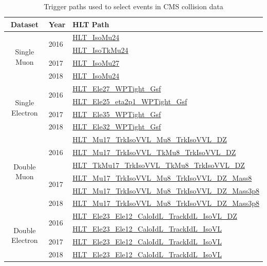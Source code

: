 \begin{table}[!ht]
  \centering
  \caption{Trigger paths used to select events in CMS collision data}
  \begin{tabular}{cll}%
    \toprule
    Dataset & Year                  & HLT Path                                          \\
    \midrule
    \multirow{4}{*}{Single Muon}
            & \multirow{2}{*}{2016} & \url{HLT_IsoMu24}                                 \\
            &                       & \url{HLT_IsoTkMu24}                               \\
    \cmidrule(lr){2-3}
            & \multirow{1}{*}{2017} & \url{HLT_IsoMu27}                                 \\
    \cmidrule(lr){2-3}
            & \multirow{1}{*}{2018} & \url{HLT_IsoMu24}                                 \\
    \midrule
    \multirow{4}{*}{Single Electron}
            & \multirow{2}{*}{2016} & \url{HLT_Ele27_WPTight_Gsf}                       \\
            &                       & \url{HLT_Ele25_eta2p1_WPTight_Gsf}                \\
    \cmidrule(lr){2-3}
            & \multirow{1}{*}{2017} & \url{HLT_Ele35_WPTight_Gsf}                       \\
    \cmidrule(lr){2-3}
            & \multirow{1}{*}{2018} & \url{HLT_Ele32_WPTight_Gsf}                       \\
    \midrule
    \multirow{6}{*}{Double Muon}
            & \multirow{3}{*}{2016} & \url{HLT_Mu17_TrkIsoVVL_Mu8_TrkIsoVVL_DZ}         \\
            &                       & \url{HLT_Mu17_TrkIsoVVL_TkMu8_TrkIsoVVL_DZ}       \\
            &                       & \url{HLT_TkMu17_TrkIsoVVL_TkMu8_TrkIsoVVL_DZ}     \\
    \cmidrule(lr){2-3}
            & \multirow{2}{*}{2017} & \url{HLT_Mu17_TrkIsoVVL_Mu8_TrkIsoVVL_DZ_Mass8}   \\
            &                       & \url{HLT_Mu17_TrkIsoVVL_Mu8_TrkIsoVVL_DZ_Mass3p8} \\
    \cmidrule(lr){2-3}
            & \multirow{1}{*}{2018} & \url{HLT_Mu17_TrkIsoVVL_Mu8_TrkIsoVVL_DZ_Mass3p8} \\
    \midrule
    \multirow{4}{*}{Double Electron}
            & \multirow{2}{*}{2016} & \url{HLT_Ele23_Ele12_CaloIdL_TrackIdL_IsoVL_DZ}   \\
            &                       & \url{HLT_Ele23_Ele12_CaloIdL_TrackIdL_IsoVL}      \\
    \cmidrule(lr){2-3}
            & \multirow{1}{*}{2017} & \url{HLT_Ele23_Ele12_CaloIdL_TrackIdL_IsoVL}      \\
    \cmidrule(lr){2-3}
            & \multirow{1}{*}{2018} & \url{HLT_Ele23_Ele12_CaloIdL_TrackIdL_IsoVL}      \\
    \bottomrule
  \end{tabular}\label{tab:hlt-paths}
\end{table}

